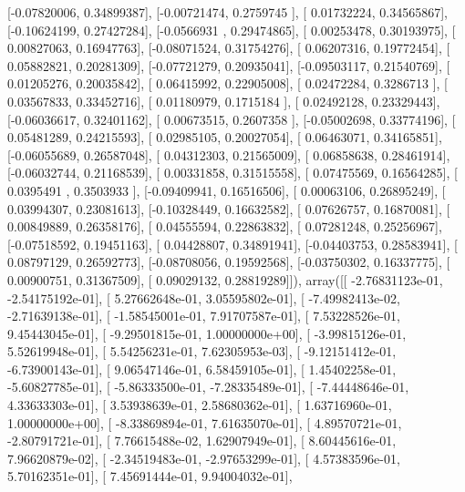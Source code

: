 \documentclass{article}
\begin{document}
       [-0.07820006,  0.34899387],
       [-0.00721474,  0.2759745 ],
       [ 0.01732224,  0.34565867],
       [-0.10624199,  0.27427284],
       [-0.0566931 ,  0.29474865],
       [ 0.00253478,  0.30193975],
       [ 0.00827063,  0.16947763],
       [-0.08071524,  0.31754276],
       [ 0.06207316,  0.19772454],
       [ 0.05882821,  0.20281309],
       [-0.07721279,  0.20935041],
       [-0.09503117,  0.21540769],
       [ 0.01205276,  0.20035842],
       [ 0.06415992,  0.22905008],
       [ 0.02472284,  0.3286713 ],
       [ 0.03567833,  0.33452716],
       [ 0.01180979,  0.1715184 ],
       [ 0.02492128,  0.23329443],
       [-0.06036617,  0.32401162],
       [ 0.00673515,  0.2607358 ],
       [-0.05002698,  0.33774196],
       [ 0.05481289,  0.24215593],
       [ 0.02985105,  0.20027054],
       [ 0.06463071,  0.34165851],
       [-0.06055689,  0.26587048],
       [ 0.04312303,  0.21565009],
       [ 0.06858638,  0.28461914],
       [-0.06032744,  0.21168539],
       [ 0.00331858,  0.31515558],
       [ 0.07475569,  0.16564285],
       [ 0.0395491 ,  0.3503933 ],
       [-0.09409941,  0.16516506],
       [ 0.00063106,  0.26895249],
       [ 0.03994307,  0.23081613],
       [-0.10328449,  0.16632582],
       [ 0.07626757,  0.16870081],
       [ 0.00849889,  0.26358176],
       [ 0.04555594,  0.22863832],
       [ 0.07281248,  0.25256967],
       [-0.07518592,  0.19451163],
       [ 0.04428807,  0.34891941],
       [-0.04403753,  0.28583941],
       [ 0.08797129,  0.26592773],
       [-0.08708056,  0.19592568],
       [-0.03750302,  0.16337775],
       [ 0.00900751,  0.31367509],
       [ 0.09029132,  0.28819289]]), array([[ -2.76831123e-01,  -2.54175192e-01],
       [  5.27662648e-01,   3.05595802e-01],
       [ -7.49982413e-02,  -2.71639138e-01],
       [ -1.58545001e-01,   7.91707587e-01],
       [  7.53228526e-01,   9.45443045e-01],
       [ -9.29501815e-01,   1.00000000e+00],
       [ -3.99815126e-01,   5.52619948e-01],
       [  5.54256231e-01,   7.62305953e-03],
       [ -9.12151412e-01,  -6.73900143e-01],
       [  9.06547146e-01,   6.58459105e-01],
       [  1.45402258e-01,  -5.60827785e-01],
       [ -5.86333500e-01,  -7.28335489e-01],
       [ -7.44448646e-01,   4.33633303e-01],
       [  3.53938639e-01,   2.58680362e-01],
       [  1.63716960e-01,   1.00000000e+00],
       [ -8.33869894e-01,   7.61635070e-01],
       [  4.89570721e-01,  -2.80791721e-01],
       [  7.76615488e-02,   1.62907949e-01],
       [  8.60445616e-01,   7.96620879e-02],
       [ -2.34519483e-01,  -2.97653299e-01],
       [  4.57383596e-01,   5.70162351e-01],
       [  7.45691444e-01,   9.94004032e-01],
\end{document}
